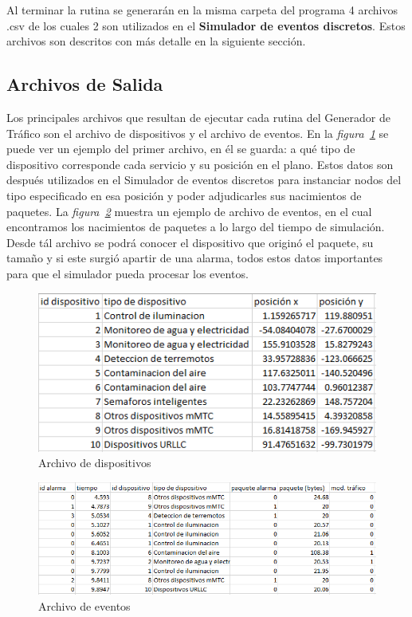 Al terminar la rutina se generarán en la misma carpeta del programa 4 archivos .csv de los cuales 2 son utilizados en el \textbf{Simulador de eventos discretos}. Estos archivos son descritos con más detalle en la siguiente sección. \newline

\subsection{Archivos de Salida}

Los principales archivos que resultan de ejecutar cada rutina del Generador de Tráfico son el archivo de dispositivos y el archivo de eventos. En la \textit{figura~\ref{fig:archivodispositivos}} se puede ver un ejemplo del primer archivo, en él se guarda: a qué tipo de dispositivo corresponde cada servicio y su posición en el plano. Estos datos son después utilizados en el Simulador de eventos discretos para instanciar nodos del tipo especificado en esa posición y poder adjudicarles sus nacimientos de paquetes. La \textit{figura~\ref{fig:archivoeventos}} muestra un ejemplo de archivo de eventos, en el cual encontramos los nacimientos de paquetes a lo largo del tiempo de simulación. Desde tál archivo se podrá conocer el dispositivo que originó el paquete, su tamaño y si este surgió apartir de una alarma, todos estos datos importantes para que el simulador pueda procesar los eventos.  \newline

\begin{figure}[th]
    \centering
    \includegraphics[scale=.75]{Figures/disparchivo.png}
    \decoRule
    \caption[Archivo de dispositivos]{Archivo de dispositivos}
    \label{fig:archivodispositivos}
\end{figure}

\begin{figure}[th]
    \centering
    \includegraphics[scale=.75]{Figures/eventosarchivo.png}
    \decoRule
    \caption[Archivo de eventos]{Archivo de eventos}
    \label{fig:archivoeventos}
\end{figure}

